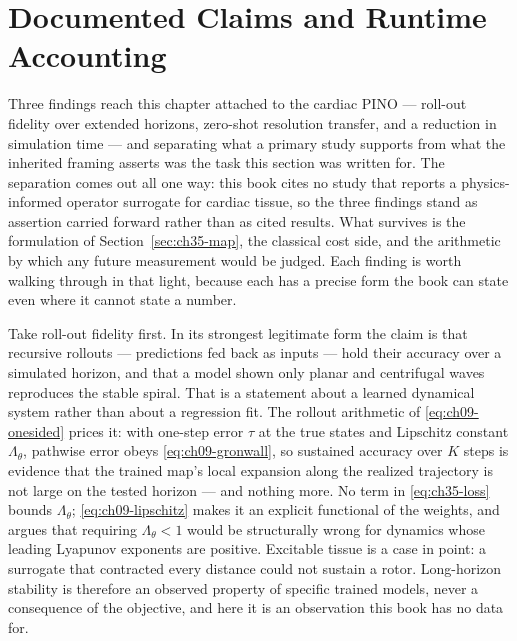 \section{Documented Claims and Runtime Accounting}
\label{sec:ch35-claims}

Three findings reach this chapter attached to the cardiac PINO --- roll-out
fidelity over extended horizons, zero-shot resolution transfer, and a reduction
in simulation time --- and separating what a primary study supports from what the
inherited framing asserts was the task this section was written for. The separation comes
out all one way: this book cites no study that reports a physics-informed operator
surrogate for cardiac tissue, so the three findings stand as assertion carried
forward rather than as cited results. What survives is the formulation of
Section~\ref{sec:ch35-map}, the classical cost side, and the arithmetic by which
any future measurement would be judged. Each finding is worth walking through in
that light, because each has a precise form the book can state even where it
cannot state a number.

Take roll-out fidelity first. In its strongest legitimate form the claim is that
recursive rollouts --- predictions fed back as
inputs --- hold their accuracy over a simulated horizon, and that a model shown only
planar and centrifugal waves reproduces the stable spiral. That is a statement
about a learned dynamical system rather than about a regression fit. The rollout
arithmetic of
\eqref{eq:ch09-onesided} prices it: with one-step error $\tau$ at the true
states and Lipschitz constant $\Lambda_\theta$, pathwise error obeys
\eqref{eq:ch09-gronwall}, so sustained accuracy over $K$ steps is evidence that
the trained map's local expansion along the realized trajectory is not large on
the tested horizon --- and nothing more. No term in \eqref{eq:ch35-loss} bounds
$\Lambda_\theta$; \eqref{eq:ch09-lipschitz} makes it an explicit functional of
the weights, and 
argues that requiring $\Lambda_\theta<1$ would be structurally wrong for
dynamics whose leading Lyapunov exponents are positive. Excitable tissue is a
case in point: a surrogate that contracted every distance could not sustain a
rotor. Long-horizon stability is therefore an observed property of specific
trained models, never a consequence of the objective, and here it is an
observation this book has no data for.

